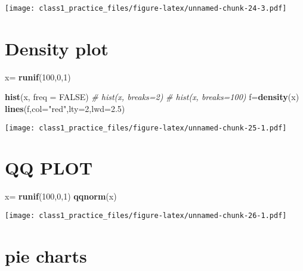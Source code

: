 \documentclass[
]{article}
\newenvironment{Shaded}{\begin{snugshade}}{\end{snugshade}}
\newcommand{\AttributeTok}[1]{\textcolor[rgb]{0.13,0.29,0.53}{#1}}
\newcommand{\CommentTok}[1]{\textcolor[rgb]{0.56,0.35,0.01}{\textit{#1}}}
\newcommand{\ConstantTok}[1]{\textcolor[rgb]{0.56,0.35,0.01}{#1}}
\newcommand{\DecValTok}[1]{\textcolor[rgb]{0.00,0.00,0.81}{#1}}
\newcommand{\FloatTok}[1]{\textcolor[rgb]{0.00,0.00,0.81}{#1}}
\newcommand{\FunctionTok}[1]{\textcolor[rgb]{0.13,0.29,0.53}{\textbf{#1}}}
\newcommand{\NormalTok}[1]{#1}
\newcommand{\OtherTok}[1]{\textcolor[rgb]{0.56,0.35,0.01}{#1}}
\newcommand{\SpecialCharTok}[1]{\textcolor[rgb]{0.81,0.36,0.00}{\textbf{#1}}}
\newcommand{\StringTok}[1]{\textcolor[rgb]{0.31,0.60,0.02}{#1}}
\begin{document}
\texttt{[image: class1\_practice\_files/figure-latex/unnamed-chunk-24-3.pdf]}

\hypertarget{density-plot}{%
\section{Density plot}\label{density-plot}}

\begin{Shaded}
\begin{Highlighting}[]
\NormalTok{x}\OtherTok{=} \FunctionTok{runif}\NormalTok{(}\DecValTok{100}\NormalTok{,}\DecValTok{0}\NormalTok{,}\DecValTok{1}\NormalTok{)}

\FunctionTok{hist}\NormalTok{(x, }\AttributeTok{freq =} \ConstantTok{FALSE}\NormalTok{)}
\CommentTok{\# hist(x, breaks=2)}
\CommentTok{\# hist(x, breaks=100)}
\NormalTok{f}\OtherTok{=}\FunctionTok{density}\NormalTok{(x)}
\FunctionTok{lines}\NormalTok{(f,}\AttributeTok{col=}\StringTok{"red"}\NormalTok{,}\AttributeTok{lty=}\DecValTok{2}\NormalTok{,}\AttributeTok{lwd=}\FloatTok{2.5}\NormalTok{)}
\end{Highlighting}
\end{Shaded}

\texttt{[image: class1\_practice\_files/figure-latex/unnamed-chunk-25-1.pdf]}

\hypertarget{qq-plot}{%
\section{QQ PLOT}\label{qq-plot}}

\begin{Shaded}
\begin{Highlighting}[]
\NormalTok{x}\OtherTok{=} \FunctionTok{runif}\NormalTok{(}\DecValTok{100}\NormalTok{,}\DecValTok{0}\NormalTok{,}\DecValTok{1}\NormalTok{)}
\FunctionTok{qqnorm}\NormalTok{(x)}
\end{Highlighting}
\end{Shaded}

\texttt{[image: class1\_practice\_files/figure-latex/unnamed-chunk-26-1.pdf]}

\hypertarget{pie-charts}{%
\section{pie charts}\label{pie-charts}}

\begin{Shaded}
\end{Shaded}
\end{document}

